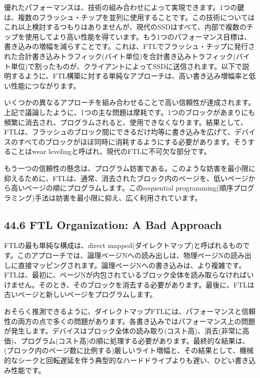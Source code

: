 優れたパフォーマンスは、技術の組み合わせによって実現できます。1つの鍵は、複数のフラッシュ・チップを並列に使用することです。この技術についてはこれ以上検討するつもりはありませんが、現代のSSDはすべて、内部で複数のチップを使用してより高い性能を得ています。もう1つのパフォーマンス目標は、書き込みの増幅を減らすことです。これは、FTLでフラッシュ・チップに発行された合計書き込みトラフィック(バイト単位)を合計書き込みトラフィック(バイト単位)で割ったものが、クライアントによってSSDに送信されます。以下で説明するように、FTL構築に対する単純なアプローチは、高い書き込み増幅率と低い性能につながります。

いくつかの異なるアプローチを組み合わせることで高い信頼性が達成されます。上記で議論したように、1つの主な問題は摩耗です。1つのブロックがあまりにも頻繁に消去され、プログラムされると、使用できなくなります。結果として、FTLは、フラッシュのブロック間にできるだけ均等に書き込みを広げて、デバイスのすべてのブロックがほぼ同時に消耗するようにする必要があります。そうすることはwear
levelingと呼ばれ、現代のFTLに不可欠な部分です。

もう一つの信頼性の懸念は、プログラム妨害である。このような妨害を最小限に抑えるために、FTLは、通常、消去されたブロック内のページを、低いページから高いページの順にプログラムします。このsequential
programming(順序プログラミング)手法は妨害を最小限に抑え、広く利用されています。

\hypertarget{ftl-organization-a-bad-approach}{%
\subsection*{44.6 FTL Organization: A Bad
Approach}\label{ftl-organization-a-bad-approach}}

FTLの最も単純な構成は、direct
mapped(ダイレクトマップ)と呼ばれるものです。このアプローチでは、論理ページNへの読み出しは、物理ページNの読み出しに直接マッピングされます。論理ページNへの書き込みは、より複雑です。FTLは、最初に、ページNが内包されているブロック全体を読み取らなければいけません。そのとき、そのブロックを消去する必要があります。最後に、FTLは古いページと新しいページをプログラムします。

おそらく推測できるように、ダイレクトマップFTLには、パフォーマンスと信頼性の両方の点で多くの問題があります。各書き込みではパフォーマンス上の問題が発生します。デバイスはブロック全体の読み取り(コスト高)、消去(非常に高価)、プログラム(コスト高)の順に処理する必要があります。最終的な結果は、(ブロック内のページ数に比例する)厳しいライト増幅と、その結果として、機械的なシークと回転遅延を伴う典型的なハードドライブよりも遅い、ひどい書き込み性能です。

